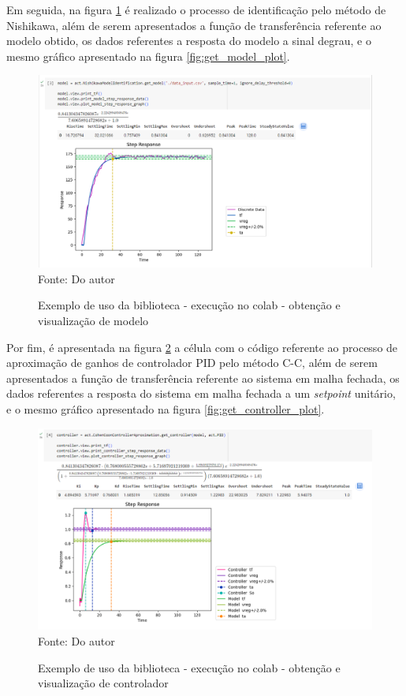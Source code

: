 Em seguida, na figura \ref{fig:colab_example2} é realizado o processo de identificação pelo método de Nishikawa,
além de serem apresentados a função de transferência referente ao modelo obtido, os dados referentes a resposta do
modelo a sinal degrau, e o mesmo gráfico apresentado na figura \ref{fig:get_model_plot}.

\begin{figure}[H]
    \centering
    \caption{Exemplo de uso da biblioteca - execução no colab - obtenção e visualização de modelo}
    \includegraphics[scale=0.5]{figuras/colab_example2}
    \label{fig:colab_example2}
    \\
    \vspace{0cm}\hspace{0cm}\small{Fonte: Do autor}
\end{figure}

Por fim, é apresentada na figura \ref{fig:colab_example3} a célula com o código referente ao processo de aproximação de
ganhos de controlador PID pelo método C-C, além de serem apresentados a função de transferência referente ao sistema em
malha fechada, os dados referentes a resposta do sistema em malha fechada a um \textit{setpoint} unitário, e o mesmo
gráfico apresentado na figura \ref{fig:get_controller_plot}.

\begin{figure}[H]
    \centering
    \caption{Exemplo de uso da biblioteca - execução no colab - obtenção e visualização de controlador}
    \includegraphics[scale=0.5]{figuras/colab_example3}
    \label{fig:colab_example3}
    \\
    \vspace{0cm}\hspace{0cm}\small{Fonte: Do autor}
\end{figure}


